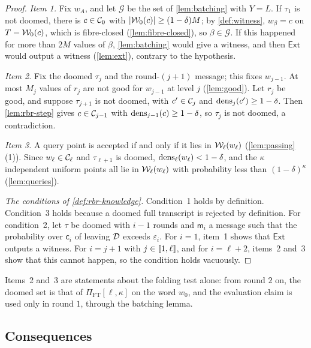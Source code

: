 \begin{proof}
\emph{Item 1.} Fix $w_A$, and let $\mathcal{G}$ be the set of \cref{lem:batching} with $Y = L$. If $\tau_1$ is not doomed, there is $c \in \mathcal{C}_0$ with $|\mathcal{W}_0(c)| \ge (1-\delta)M$; by \cref{def:witness}, $w_\beta = c$ on $T = \mathcal{W}_0(c)$, which is fibre-closed (\cref{lem:fibre-closed}), so $\beta \in \mathcal{G}$.
If this happened for more than $2M$ values of $\beta$, \cref{lem:batching} would give a witness, and then $\mathsf{Ext}$ would output a witness (\cref{lem:ext}), contrary to the hypothesis.

\emph{Item 2.} Fix the doomed $\tau_j$ and the round-$(j+1)$ message; this fixes $w_{j-1}$. At most $M_j$ values of $r_j$ are not good for $w_{j-1}$ at level $j$ (\cref{lem:good}).
Let $r_j$ be good, and suppose $\tau_{j+1}$ is not doomed, with $c' \in \mathcal{C}_j$ and $\mathrm{dens}_j(c') \ge 1-\delta$. Then \cref{lem:rbr-step} gives $c \in \mathcal{C}_{j-1}$ with $\mathrm{dens}_{j-1}(c) \ge 1-\delta$, so $\tau_j$ is not doomed, a contradiction.

\emph{Item 3.} A query point is accepted if and only if it lies in $\mathcal{W}_\ell(w_\ell)$ (\cref{lem:passing}(1)). Since $w_\ell \in \mathcal{C}_\ell$ and $\tau_{\ell+1}$ is doomed, $\mathrm{dens}_\ell(w_\ell) < 1-\delta$, and the $\kappa$ independent uniform points all lie in $\mathcal{W}_\ell(w_\ell)$ with probability less than $(1-\delta)^\kappa$ (\cref{lem:queries}).

\emph{The conditions of \cref{def:rbr-knowledge}.} Condition~1 holds by definition. Condition~3 holds because a doomed full transcript is rejected by definition. For condition~2, let $\tau$ be doomed with $i-1$ rounds and $\mathsf{m}_i$ a message such that the probability over $\mathsf{c}_i$ of leaving $\mathcal{D}$ exceeds $\varepsilon_i$. For $i = 1$, item~1 shows that $\mathsf{Ext}$ outputs a witness. For $i = j+1$ with $j \in \llbracket 1, \ell \rrbracket$, and for $i = \ell+2$, items~2 and~3 show that this cannot happen, so the condition holds vacuously.
\end{proof}

Items~2 and~3 are statements about the folding test alone: from round $2$ on, the doomed set is that of $\Pi_{\mathrm{FT}}[\ell,\kappa]$ on the word $w_0$, and the evaluation claim is used only in round $1$, through the batching lemma.

\subsection{Consequences}\label{sec:sound:cons}

